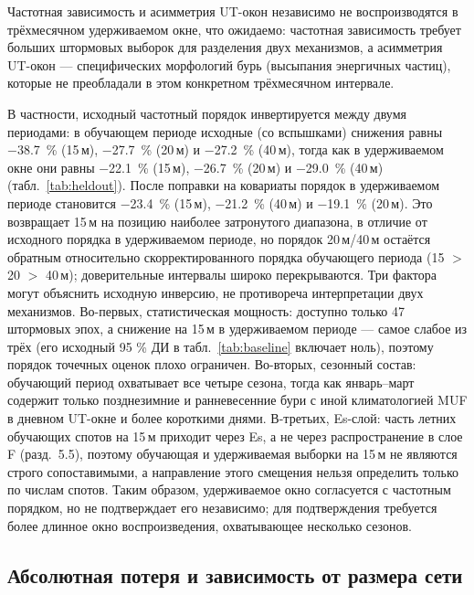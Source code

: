 \documentclass{agujournal2019}
\begin{document}
Частотная зависимость и асимметрия UT-окон независимо не воспроизводятся
в трёхмесячном удерживаемом окне, что ожидаемо: частотная зависимость
требует больших штормовых выборок для разделения двух механизмов,
а асимметрия UT-окон — специфических морфологий бурь (высыпания энергичных
частиц), которые не преобладали в этом конкретном трёхмесячном интервале.

В частности, исходный частотный порядок инвертируется между двумя периодами:
в обучающем периоде исходные (со вспышками) снижения равны
	\SI{-38.7}{\percent} (15\,м),
\SI{-27.7}{\percent} (20\,м) и \SI{-27.2}{\percent} (40\,м), тогда как
в удерживаемом окне они равны \SI{-22.1}{\percent} (15\,м),
\SI{-26.7}{\percent} (20\,м) и \SI{-29.0}{\percent} (40\,м)
(табл.~\ref{tab:heldout}). После поправки на ковариаты порядок в удерживаемом периоде становится \SI{-23.4}{\percent} (15\,м),
\SI{-21.2}{\percent} (40\,м) и \SI{-19.1}{\percent} (20\,м). Это
возвращает 15\,м на позицию наиболее затронутого диапазона, в отличие
от исходного порядка в удерживаемом периоде, но порядок 20\,м/40\,м остаётся
обратным относительно скорректированного порядка обучающего периода
(15 $>$ 20 $>$ 40\,м); доверительные интервалы широко перекрываются.
Три фактора могут объяснить исходную инверсию, не противореча
интерпретации двух механизмов. Во-первых, статистическая мощность:
доступно только 47 штормовых эпох, а снижение на 15\,м в удерживаемом периоде — самое слабое из трёх (его исходный 95 \% ДИ в
табл.~\ref{tab:baseline} включает ноль), поэтому порядок точечных оценок
плохо ограничен. Во-вторых, сезонный состав: обучающий период
охватывает все четыре сезона, тогда как январь--март содержит только
позднезимние и ранневесенние бури с иной климатологией MUF в дневном UT-окне
и более короткими днями. В-третьих, Es-слой: часть летних
обучающих спотов на 15\,м приходит через Es, а не через
распространение в слое F (разд.~5.5), поэтому обучающая и удерживаемая
выборки на 15\,м не являются строго сопоставимыми, а направление этого
смещения нельзя определить только по числам спотов. Таким образом,
удерживаемое окно согласуется с частотным порядком, но не подтверждает его
независимо; для подтверждения требуется более длинное окно
воспроизведения, охватывающее несколько сезонов.

\subsection{Абсолютная потеря и зависимость от размера сети}
\label{sec:invariant}
\end{document}
